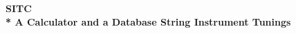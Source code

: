 \begin{titlepage}
	\centering\vspace*{\fill}\begin{minipage}{0.5\linewidth}
		\centering
		\hRule
		\vspace*{\baselineskip}
		{\bf{\huge SITC}\\*
		{\large A Calculator and a Database String Instrument Tunings}}
		\vspace*{\baselineskip}
		\hRule
	\end{minipage}\vspace*{\fill}
\end{titlepage}
